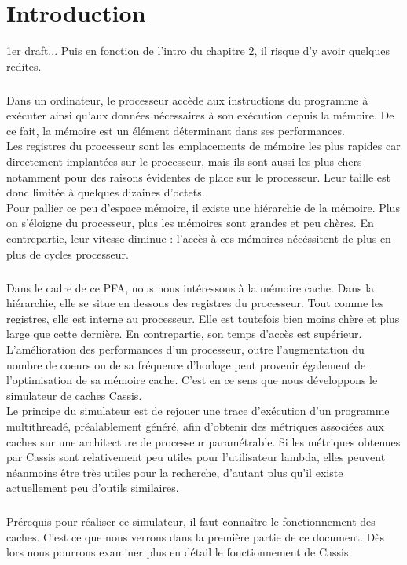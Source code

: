 \chapter*{Introduction}

1er draft... Puis en fonction de l'intro du chapitre 2, il risque d'y avoir quelques redites.

\paragraph{}
Dans un ordinateur, le processeur accède aux instructions du programme à exécuter ainsi qu'aux données nécessaires
à son exécution depuis la mémoire.
De ce fait, la mémoire est un élément déterminant dans ses performances. \\
Les registres du processeur sont les emplacements de mémoire les plus rapides car directement implantées sur le processeur, mais 
ils sont aussi les plus chers notamment pour des raisons évidentes de place sur le processeur. Leur taille est donc limitée à quelques dizaines d'octets. \\
Pour pallier ce peu d'espace mémoire, il existe une hiérarchie de la mémoire. Plus on s'éloigne du processeur, plus les mémoires sont grandes et peu chères.
En contrepartie, leur vitesse diminue : l'accès à ces mémoires nécéssitent de plus en plus de cycles processeur.
\paragraph{}
Dans le cadre de ce PFA, nous nous intéressons à la mémoire cache. Dans la hiérarchie, elle se situe en dessous des registres du processeur.
Tout comme les registres, elle est interne au processeur. Elle est toutefois bien moins chère et plus large que cette dernière. En contrepartie, son temps d'accès est supérieur.
L'amélioration des performances d'un processeur, outre l'augmentation du nombre de coeurs ou de sa fréquence d'horloge peut provenir également de
l'optimisation de sa mémoire cache. C'est en ce sens que nous développons le simulateur de caches Cassis. \\
Le principe du simulateur est de rejouer une trace d'exécution d'un programme multithreadé, préalablement
généré, afin d'obtenir des métriques associées aux caches sur une architecture de processeur paramétrable. Si les métriques obtenues par Cassis sont relativement peu utiles pour l'utilisateur lambda,
elles peuvent néanmoins être très utiles pour la recherche, d'autant plus qu'il existe actuellement peu d'outils similaires.
\paragraph{}
Prérequis pour réaliser ce simulateur, il faut connaître le fonctionnement des caches. C'est ce que nous verrons dans la première partie de ce document.
Dès lors nous pourrons examiner plus en détail le fonctionnement de Cassis.
